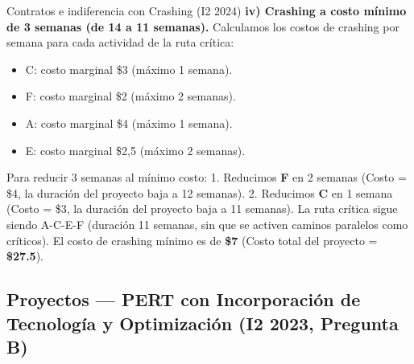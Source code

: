 \begin{ejercicio}{Contratos e indiferencia con Crashing (I2 2024)}
\textbf{iv) Crashing a costo mínimo de 3 semanas (de 14 a 11 semanas).}
Calculamos los costos de crashing por semana para cada actividad de la ruta crítica:
\begin{itemize}
  \item C: costo marginal \$3 (máximo 1 semana).
  \item F: costo marginal \$2 (máximo 2 semanas).
  \item A: costo marginal \$4 (máximo 1 semana).
  \item E: costo marginal \$2{,}5 (máximo 2 semanas).
\end{itemize}
Para reducir 3 semanas al mínimo costo:
1. Reducimos \textbf{F} en 2 semanas (Costo = \$4, la duración del proyecto baja a 12 semanas).
2. Reducimos \textbf{C} en 1 semana (Costo = \$3, la duración del proyecto baja a 11 semanas).
La ruta crítica sigue siendo A-C-E-F (duración 11 semanas, sin que se activen caminos paralelos como críticos).
El costo de crashing mínimo es de \textbf{\$7} (Costo total del proyecto = \textbf{\$27.5}).
\end{ejercicio}


\subsection[Proyectos: PERT y Tecnología (I2 2023)]{Proyectos --- PERT con Incorporación de Tecnología y Optimización (I2 2023, Pregunta B)}

